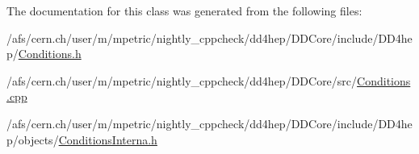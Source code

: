 The documentation for this class was generated from the following files\+:\begin{DoxyCompactItemize}
\item 
/afs/cern.\+ch/user/m/mpetric/nightly\+\_\+cppcheck/dd4hep/\+D\+D\+Core/include/\+D\+D4hep/\hyperlink{_conditions_8h}{Conditions.\+h}\item 
/afs/cern.\+ch/user/m/mpetric/nightly\+\_\+cppcheck/dd4hep/\+D\+D\+Core/src/\hyperlink{_conditions_8cpp}{Conditions.\+cpp}\item 
/afs/cern.\+ch/user/m/mpetric/nightly\+\_\+cppcheck/dd4hep/\+D\+D\+Core/include/\+D\+D4hep/objects/\hyperlink{_d_d_core_2include_2_d_d4hep_2objects_2_conditions_interna_8h}{Conditions\+Interna.\+h}\end{DoxyCompactItemize}
